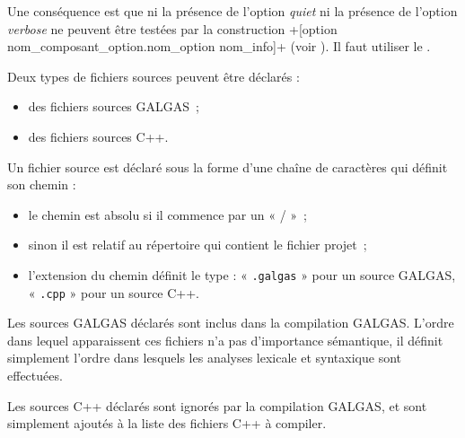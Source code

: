 Une conséquence est que ni la présence de l'option \emph{quiet} ni la présence de l'option \emph{verbose} ne peuvent être testées par la construction \ggs+[option nom_composant_option.nom_option nom_info]+ (voir ). Il faut utiliser le .








Deux types de fichiers sources peuvent être déclarés :
\begin{itemize}
  \item des fichiers sources GALGAS~;
  \item des fichiers sources C++.
\end{itemize}

Un fichier source est déclaré sous la forme d'une chaîne de caractères qui définit son chemin :
\begin{itemize}
\item le chemin est absolu si il commence par un « / »~;
\item sinon il est relatif au répertoire qui contient le fichier projet~;
\item l'extension du chemin définit le type : « \texttt{.galgas} » pour un source GALGAS, « \texttt{.cpp} » pour un source C++.
\end{itemize}

Les sources GALGAS déclarés sont inclus dans la compilation GALGAS. L'ordre dans lequel apparaissent ces fichiers n'a pas d'importance sémantique, il définit simplement l'ordre dans lesquels les analyses lexicale et syntaxique sont effectuées.

Les sources C++ déclarés sont ignorés par la compilation GALGAS, et sont simplement ajoutés à la liste des fichiers C++ à compiler.



